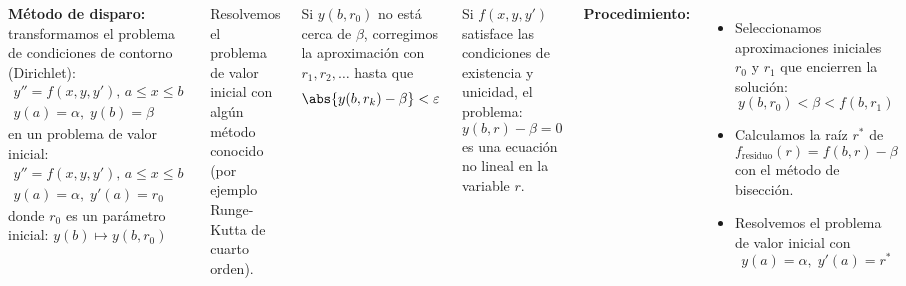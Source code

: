 \documentclass[9pt, aspectratio=169]{beamer}
\begin{document}
\begin{frame}
    \begin{columns}[t]
\cx
\textbf{Método de disparo:} transformamos el problema de condiciones de contorno (Dirichlet):
\[ \begin{split} y'' = f(x, y, y'), \, a \leq x \leq b \\ y(a) = \alpha,\; y(b) = \beta \end{split} \]
en un problema de valor inicial:
\[ \begin{split} y'' = f(x, y, y'), \, a \leq x \leq b \\ y(a) = \alpha,\; y'(a) = r_0 \end{split} \]
donde $r_0$ es un parámetro inicial: $y(b) \mapsto y(b, r_0)$ 

Resolvemos el problema de valor inicial con algún método conocido (por ejemplo Runge-Kutta de cuarto orden).

Si $y(b, r_0)$ no está cerca de $\beta$, corregimos la aproximación con $r_1, r_2, \ldots$ hasta que 
\[
    \abs{y(b, r_k) - \beta} < \varepsilon
\]

\cx
Si $f(x, y, y')$ satisface las condiciones de existencia y unicidad, el problema:
\[ y(b, r) - \beta = 0 \]
es una ecuación no lineal en la variable $r$. \pause

\textbf{Procedimiento:}
\begin{itemize}
    \item Seleccionamos aproximaciones iniciales $r_0$ y $r_1$ que \alert{encierren} la solución: 
        \[ y(b, r_0) < \beta < f(b, r_1) \]
    \item Calculamos la raíz $r^*$ de
        \[ f_{\text{residuo}}(r) = f(b, r) - \beta \]
        con el método de bisección.
    \item Resolvemos el problema de valor inicial con 
        \[y(a) = \alpha,\; y'(a) = r^{*} \]
\end{itemize}
\end{columns}
\end{frame}
\end{document}
